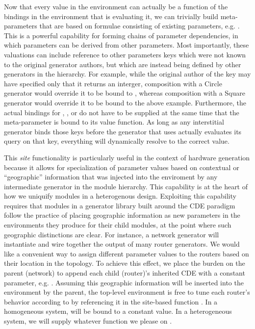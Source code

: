 Now that every value in the environment can actually be a function of the bindings in the environment that is evaluating it, we can trivially
build meta-parameters that are based on formulae consisting of existing parameters, e.g. .
This is a powerful capability for forming chains of parameter dependencies, in which parameters can be derived from other parameters.
Most importantly, these valuations can include reference to other parameters keys which were not known to the original generator authors,
but which are instead being defined by other generators in the hierarchy.
For example, while the original author of the  key may have specified only that it returns an interger,
composition with a Circle generator would override it to be bound to , whereas
composition with a Square generator would override it to be bound to the above example.
Furthermore, the actual bindings for , , or  do not have to be supplied at the same time that
the meta-parameter  is bound to its value function.
As long as any interstitial generator binds those keys before the generator that uses  actually evaluates its query on that key,
everything will dynamically resolve to the correct value.

This \emph{site} functionality is particularly useful in the context of hardware generation because 
it allows for specialization of parameter values based on contextual or ``geographic'' information that was injected into the enviroment by any intermediate generator in the module hierarchy.
This capability is at the heart of how we uniquify modules in a heterogenous design.
Exploiting this capability requires that modules in a generator library built around the CDE paradigm follow the practice of placing geographic information
as new parameters in the environments they produce for their child modules, at the point where such geographic distinctions are clear. 
For instance, a network generator will instantiate and wire together the output of many router generators.
We would like a convenient way to assign different parameter values to the routers based on their location in the topology.
To achieve this effect, we place the burden on the parent (network) to append each child (router)'s inherited CDE with a constant parameter, e.g. .
Assuming this geographic information will be inserted into the environment by the parent,
the top-level environment is free to tune each router's behavior according to 
by referencing it in the site-based function .
In a homogeneous system,  will be bound to a constant value.
In a heterogeneous system, we will supply whatever function we please on .

